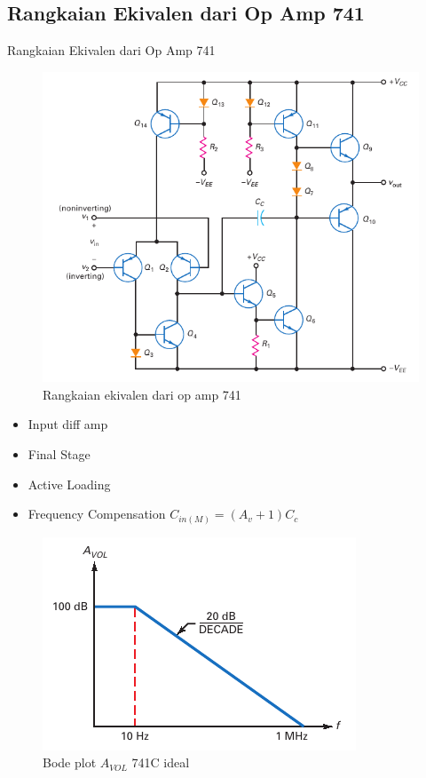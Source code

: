 \subsection{Rangkaian Ekivalen dari Op Amp 741}
\begin{frame}{Rangkaian Ekivalen dari Op Amp 741}
	\begin{multicols}{2}
		\begin{figure}
			\centering
			\includegraphics[width=0.9\linewidth]{gambar/fig-16.04}
			\caption{Rangkaian ekivalen dari op amp 741}
			\label{fig-16.04}
		\end{figure}
		\columnbreak
		\begin{itemize}
			\item Input diff amp
			\item Final Stage
			\item Active Loading
			\item Frequency Compensation $ C_{in(M)} = (A_v + 1) C_c $
		\end{itemize}
		\begin{figure}
			\centering
			\includegraphics[width=0.5\linewidth]{gambar/fig-16.05}
			\caption{Bode plot $ A_{VOL} $ 741C ideal}
			\label{fig-16.05}
		\end{figure}
	\vfill\null
	\end{multicols}
\end{frame}

